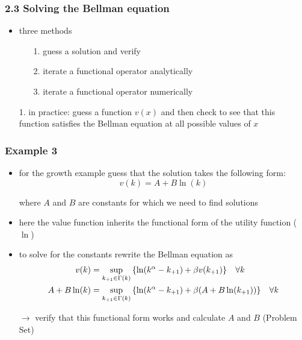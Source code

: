 \documentclass[compress,aspectratio=169]{beamer}
\begin{document}
\begin{frame}
\frametitle{2.3 Solving the Bellman equation}
\begin{itemize}
\item three methods
\vspace{3 mm}
	\begin{itemize}
	\item[1.] guess a solution and verify
	\vspace{3 mm}
	\item[2.] iterate a functional operator analytically
	\vspace{3 mm}
	\item[3.] iterate a functional operator numerically
	\vspace{3 mm}
	\end{itemize}
\vspace{3 mm}
\item[1.] in practice: guess a function $v(x)$ and then check to see that this function satisfies the Bellman equation at all possible values of $x$
\end{itemize}
\end{frame}

\begin{frame}
\frametitle{Example 3}
\begin{itemize}
\item for the growth example guess that the solution takes the following form:
\begin{displaymath}
v(k)=A + B \ln(k)
\end{displaymath}
\item[] where $A$ and $B$ are constants for which we need to find solutions
\item here the value function inherits the functional form of the utility function ($\ln$)
\item to solve for the constants rewrite the Bellman equation as
\begin{align*}
v(k) & = \sup_{k_{+1}\in\Gamma(k)} \left\{ \ln(k^\alpha-k_{+1})+\beta v(k_{+1})\right\} \hspace{3 mm} \forall k \\
A+B \ln(k) & = \sup_{k_{+1}\in\Gamma(k)} \left\{ \ln(k^\alpha-k_{+1})+\beta (A+B \ln(k_{+1}))\right\} \hspace{3 mm} \forall k
\end{align*}
\item[$\rightarrow$] verify that this functional form works and calculate $A$ and $B$ (Problem Set)
\end{itemize}
\end{frame}
\end{document}

